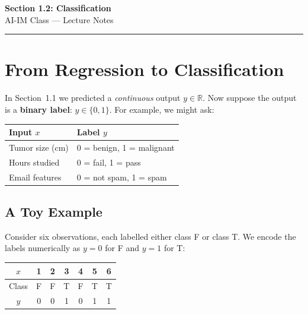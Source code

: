 \documentclass[12pt, a4paper]{article}
\begin{document}
\begin{center}
  {\LARGE \textbf{Section 1.2: Classification}} \\[0.5em]
  {\large AI-IM Class — Lecture Notes}%
  \ifstudentmode
  \fi
\end{center}

\vspace{1em}
\hrule
\vspace{1.5em}

\section{From Regression to Classification}

In Section~1.1 we predicted a \emph{continuous} output $y \in \mathbb{R}$.
Now suppose the output is a \textbf{binary label}: $y \in \{0, 1\}$.
For example, we might ask:

\begin{center}
  \renewcommand{\arraystretch}{1.2}
  \begin{tabular}{ll}
    \toprule
    \textbf{Input $x$} & \textbf{Label $y$}        \\
    \midrule
    Tumor size (cm)    & 0 = benign, 1 = malignant \\
    Hours studied      & 0 = fail, 1 = pass        \\
    Email features     & 0 = not spam, 1 = spam    \\
    \bottomrule
  \end{tabular}
\end{center}

\subsection{A Toy Example}

Consider six observations, each labelled either class F or class T.
We encode the labels numerically as $y = 0$ for F and $y = 1$ for T:

\begin{center}
  \renewcommand{\arraystretch}{1.2}
  \begin{tabular}{c|cccccc}
    \toprule
    $x$   & 1 & 2 & 3 & 4 & 5 & 6 \\
    \midrule
    Class & F & F & T & F & T & T \\
    $y$   & 0 & 0 & 1 & 0 & 1 & 1 \\
    \bottomrule
  \end{tabular}
\end{center}
\end{document}
